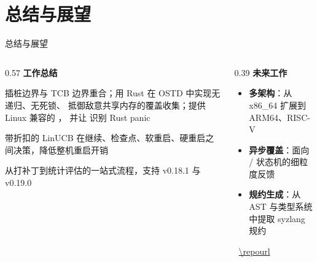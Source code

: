 \section{总结与展望}

\begin{frame}{总结与展望}
\begin{columns}[T,onlytextwidth]
\begin{column}{0.57\textwidth}
\textbf{工作总结}

\vspace{1mm}
\begin{tcolorbox}[rustcard,title={面向框内核的覆盖制导灰盒模糊测试}]
  插桩边界与 TCB 边界重合；用 Rust 在 OSTD 中实现无递归、无死锁、
  抵御敌意共享内存的覆盖收集；提供 Linux 兼容的 ，
  并让 \syz{} 识别 Rust panic
\end{tcolorbox}
\vspace{1mm}
\begin{tcolorbox}[syzcard,title={自适应内核生命周期管理}]
  带折扣的 LinUCB 在继续、检查点、软重启、硬重启之间决策，降低整机重启开销
\end{tcolorbox}
\vspace{1mm}
\begin{tcolorbox}[tcbcard,title={完整的工程闭环}]
  从打补丁到统计评估的一站式流程，支持 \aster{} v0.18.1 与 v0.19.0
\end{tcolorbox}
\end{column}
\begin{column}{0.39\textwidth}
\textbf{未来工作}

\vspace{1mm}
\begin{itemize}\small
  \item \textbf{多架构}：从 x86\_64 扩展到 ARM64、RISC-V
  \item \textbf{异步覆盖}：面向 / 状态机的细粒度反馈
  \item \textbf{规约生成}：从 AST 与类型系统中提取 syzlang 规约
\end{itemize}

\vspace{2mm}
\centering
\qrcode[height=1.9cm]{\repourl}

\vspace{1mm}
{\scriptsize\faGithub\ \url{\repourl}}
\end{column}
\end{columns}
\end{frame}


